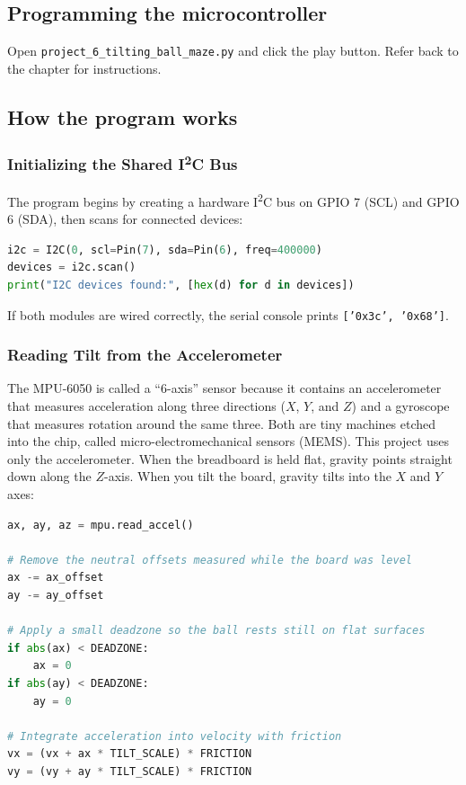 \subsection{Programming the microcontroller}

Open \texttt{project\_6\_tilting\_ball\_maze.py} and click the play button.
Refer back to the  chapter for instructions.

\subsection{How the program works}

\subsubsection{Initializing the Shared I\textsuperscript{2}C Bus}
The program begins by creating a hardware I\textsuperscript{2}C bus on GPIO 7 (SCL) and GPIO 6 (SDA), then
scans for connected devices:

\begin{lstlisting}[language=Python, caption=Initializing I2C and discovering devices]
i2c = I2C(0, scl=Pin(7), sda=Pin(6), freq=400000)
devices = i2c.scan()
print("I2C devices found:", [hex(d) for d in devices])
\end{lstlisting}

If both modules are wired correctly, the serial console prints \texttt{['0x3c', '0x68']}.

\subsubsection{Reading Tilt from the Accelerometer}
The MPU-6050 is called a ``6-axis'' sensor because it contains an accelerometer that measures acceleration
along three directions ($X$, $Y$, and $Z$) and a gyroscope that measures rotation around the same three.
Both are tiny machines etched into the chip, called micro-electromechanical sensors (MEMS). This project
uses only the accelerometer.
When the breadboard is held flat, gravity points straight down along the $Z$-axis. When you tilt the board,
gravity tilts into the $X$ and $Y$ axes:

\begin{lstlisting}[language=Python, caption=Converting tilt into ball acceleration]
ax, ay, az = mpu.read_accel()

# Remove the neutral offsets measured while the board was level
ax -= ax_offset
ay -= ay_offset

# Apply a small deadzone so the ball rests still on flat surfaces
if abs(ax) < DEADZONE:
    ax = 0
if abs(ay) < DEADZONE:
    ay = 0

# Integrate acceleration into velocity with friction
vx = (vx + ax * TILT_SCALE) * FRICTION
vy = (vy + ay * TILT_SCALE) * FRICTION
\end{lstlisting}

